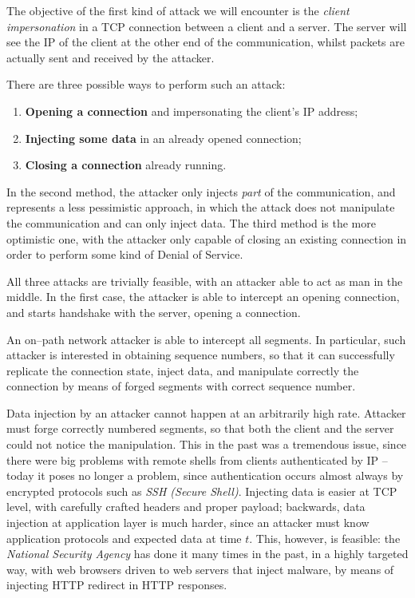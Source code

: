 \documentclass[10pt]{extbook}
\begin{document}
The objective of the first kind of attack we will encounter is the \emph{client
impersonation} in a TCP connection between a client and a server. The server
will see the IP of the client at the other end of the communication, whilst
packets are actually sent and received by the attacker.

There are three possible ways to perform such an attack:
\begin{enumerate}
    \item \textbf{Opening a connection} and impersonating the client's IP
        address;
    \item \textbf{Injecting some data} in an already opened connection;
    \item \textbf{Closing a connection} already running.
\end{enumerate}

In the second method, the attacker only injects \emph{part} of the
communication, and represents a less pessimistic approach, in which the attack
does not manipulate the communication and can only inject data. The third
method is the more optimistic one, with the attacker only capable of closing an
existing connection in order to perform some kind of Denial of Service.

All three attacks are trivially feasible, with an attacker able to act as man
in the middle. In the first case, the attacker is able to intercept an opening
connection, and starts handshake with the server, opening a connection.

An on--path network attacker is able to intercept all segments. In particular,
such attacker is interested in obtaining sequence numbers, so that it can
successfully replicate the connection state, inject data, and manipulate
correctly the connection by means of forged segments with correct sequence
number.

Data injection by an attacker cannot happen at an arbitrarily high rate.
Attacker must forge correctly numbered segments, so that both the client and
the server could not notice the manipulation. This in the past was a tremendous
issue, since there were big problems with remote shells from clients
authenticated by IP -- today it poses no longer a problem, since authentication
occurs almost always by encrypted protocols such as \emph{SSH (Secure Shell)}.
Injecting data is easier at TCP level, with carefully crafted headers and
proper payload; backwards, data injection at application layer is much harder,
since an attacker must know application protocols and expected data at time
$t$. This, however, is feasible: the \emph{National Security Agency} has done
it many times in the past, in a highly targeted way, with web browsers driven
to web servers that inject malware, by means of injecting HTTP redirect in HTTP
responses.
\end{document}
